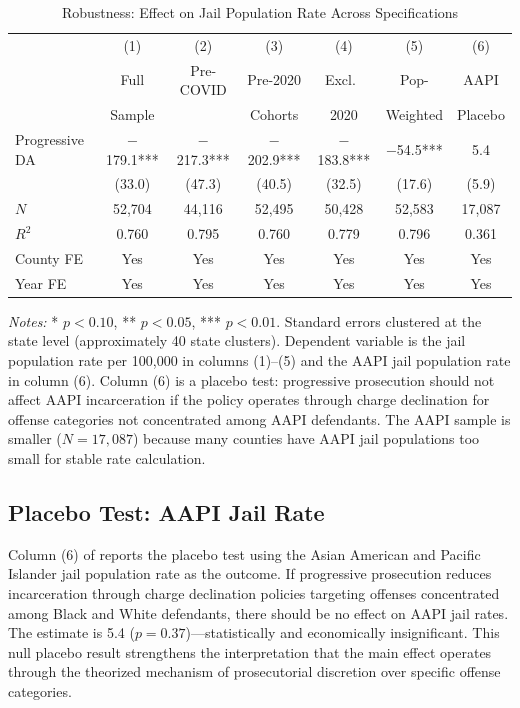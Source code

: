 \documentclass[12pt]{article}
\begin{document}
\begin{table}[H]
\centering
\caption{Robustness: Effect on Jail Population Rate Across Specifications}
\label{tab:robustness}
\begin{threeparttable}
\begin{tabular}{lcccccc}
\toprule
& (1) & (2) & (3) & (4) & (5) & (6) \\
& Full & Pre-COVID & Pre-2020 & Excl.\ & Pop- & AAPI \\
& Sample & & Cohorts & 2020 & Weighted & Placebo \\
\midrule
Progressive DA & $-$179.1*** & $-$217.3*** & $-$202.9*** & $-$183.8*** & $-$54.5*** & 5.4 \\
& (33.0) & (47.3) & (40.5) & (32.5) & (17.6) & (5.9) \\
\midrule
$N$ & 52,704 & 44,116 & 52,495 & 50,428 & 52,583 & 17,087 \\
$R^2$ & 0.760 & 0.795 & 0.760 & 0.779 & 0.796 & 0.361 \\
County FE & Yes & Yes & Yes & Yes & Yes & Yes \\
Year FE & Yes & Yes & Yes & Yes & Yes & Yes \\
\bottomrule
\end{tabular}
\begin{tablenotes}[flushleft]
\small
\item \textit{Notes:} * $p<0.10$, ** $p<0.05$, *** $p<0.01$. Standard errors clustered at the state level (approximately 40 state clusters). Dependent variable is the jail population rate per 100,000 in columns (1)--(5) and the AAPI jail population rate in column (6). Column (6) is a placebo test: progressive prosecution should not affect AAPI incarceration if the policy operates through charge declination for offense categories not concentrated among AAPI defendants. The AAPI sample is smaller ($N = 17{,}087$) because many counties have AAPI jail populations too small for stable rate calculation.
\end{tablenotes}
\end{threeparttable}
\end{table}

\subsection{Placebo Test: AAPI Jail Rate}

Column (6) of  reports the placebo test using the Asian American and Pacific Islander jail population rate as the outcome. If progressive prosecution reduces incarceration through charge declination policies targeting offenses concentrated among Black and White defendants, there should be no effect on AAPI jail rates. The estimate is 5.4 ($p = 0.37$)---statistically and economically insignificant. This null placebo result strengthens the interpretation that the main effect operates through the theorized mechanism of prosecutorial discretion over specific offense categories.
\end{document}
